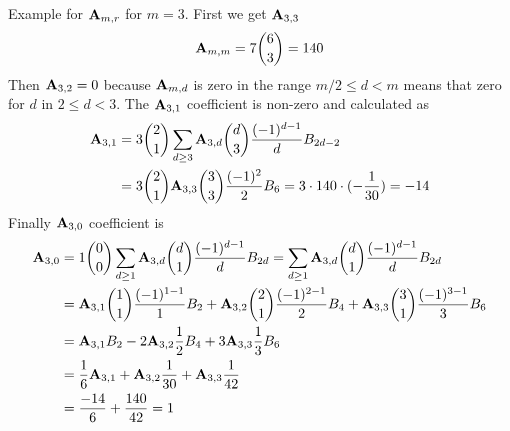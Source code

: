 \begin{examp}
    Example for ${\mathbf{A}} \sb{m,r}$ for $m=3$.
    First we get ${\mathbf{A}} \sb{3,3}$
    \begin{equation*}
        {\mathbf{A}} \sb{m,m} = 7 \binom{6}{3}= 140
    \end{equation*}
    Then ${\mathbf{A}} \sb{3,2} = 0$ because ${\mathbf{A}} \sb{m,d}$ is zero in the range $m/2 \leq d < m$ means that zero for $d$ in
    $2 \leq d < 3$.
    The ${\mathbf{A}} \sb{3,1}$ coefficient is non-zero and calculated as
    \begin{equation*}
        \begin{split}
            {\mathbf{A}} \sb{3,1}
            &= 3 \binom{2}{1} \sum_{d \geq 3} {\mathbf{A}} \sb{3,d} \binom{d}{3} \frac{(-1)^{d-1}}{d} {B}\sb{2d-2} \\
            &= 3 \binom{2}{1} {\mathbf{A}} \sb{3,3} \binom{3}{3} \frac{(-1)^2}{2} {B}\sb{6}
            = 3 \cdot 140 \cdot (-\frac{1}{30}) = -14
        \end{split}
    \end{equation*}
    Finally ${\mathbf{A}} \sb{3,0}$ coefficient is
    \begin{equation*}
        \begin{split}
            {\mathbf{A}} \sb{3,0}
            &= 1 \binom{0}{0} \sum_{d \geq 1} {\mathbf{A}} \sb{3,d} \binom{d}{1} \frac{(-1)^{d-1}}{d} {B}\sb{2d}
            = \sum_{d \geq 1} {\mathbf{A}} \sb{3,d} \binom{d}{1} \frac{(-1)^{d-1}}{d} {B}\sb{2d} \\
            & = {\mathbf{A}} \sb{3,1} \binom{1}{1} \frac{(-1)^{1-1}}{1} {B}\sb{2}
            + {\mathbf{A}} \sb{3,2} \binom{2}{1} \frac{(-1)^{2-1}}{2} {B}\sb{4}
            + {\mathbf{A}} \sb{3,3} \binom{3}{1} \frac{(-1)^{3-1}}{3} {B}\sb{6} \\
            & = {\mathbf{A}} \sb{3,1} {B}\sb{2} - 2 {\mathbf{A}} \sb{3,2} \frac{1}{2} {B}\sb{4}
            + 3 {\mathbf{A}} \sb{3,3} \frac{1}{3} {B}\sb{6} \\
            &= \frac{1}{6} {\mathbf{A}} \sb{3,1}
            + {\mathbf{A}} \sb{3,2} \frac{1}{30}
            + {\mathbf{A}} \sb{3,3} \frac{1}{42} \\
            & = \frac{-14}{6} + \frac{140}{42} = 1
        \end{split}
    \end{equation*}
\end{examp}